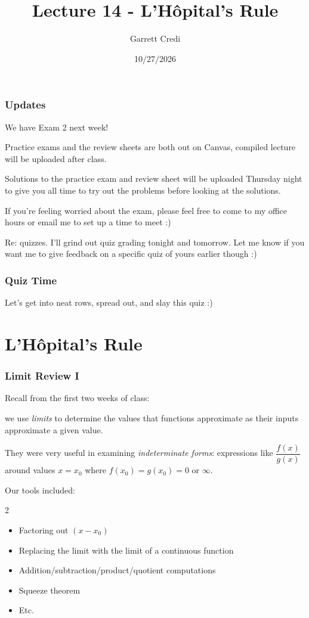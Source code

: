 \documentclass{ltx-talk}
\title{Lecture 14 - L'Hôpital's Rule}
\author{Garrett Credi}
\date{10/27/2026}
\begin{document}
\begin{frame}
  \maketitle
\end{frame}

\begin{frame}
  \frametitle{Updates}

  We have Exam 2 next week!

  Practice exams and the review sheets are both out on Canvas,
  compiled lecture will be uploaded after class.

  Solutions to the practice exam and review sheet will be uploaded Thursday night 
  to give you all time to try out the problems before looking at the solutions.

  If you're feeling worried about the exam, please feel free to come to my office hours or email me to set up a time to meet :)

  Re: quizzes. I'll grind out quiz grading tonight and tomorrow. Let me know if you want me to give feedback on a specific quiz of yours earlier though :)
\end{frame}

\begin{frame}
  \frametitle{Quiz Time}

  Let's get into neat rows, spread out, and slay this quiz :)
\end{frame}

\section{L'Hôpital's Rule}

\begin{frame}
  \frametitle{Limit Review I}

  Recall from the first two weeks of class:

  we use \textit{limits} to determine the values
  that functions approximate as their inputs approximate a given value. \pause

  They were very useful in examining \textit{indeterminate forms}:
  expressions like $\dfrac{f(x)}{g(x)}$ around values $x = x_0$
  where $f(x_0) = g(x_0) = 0$ or $\infty$. \pause

  Our tools included:
  \begin{multicols}{2}
    \begin{itemize}
      \item Factoring out $(x - x_0)$
      \item Replacing the limit with the limit of a continuous function
      \item Addition/subtraction/product/quotient computations
      \item Squeeze theorem
      \item Etc.
    \end{itemize}
  \end{multicols}
\end{frame}
\end{document}

